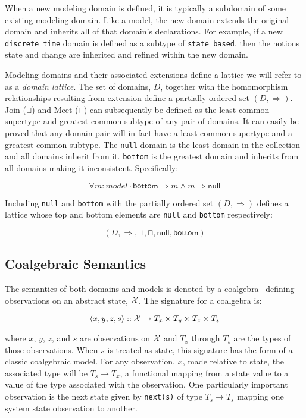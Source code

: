 \documentclass[12pt]{article}
\begin{document}
When a new modeling domain is defined, it is typically a subdomain of some existing
modeling domain.  Like a model, the new domain extends the original domain and inherits
all of that domain's declarations.  For example, if a new \lstinline!discrete_time! domain
is defined as a subtype of \lstinline!state_based!, then the notions state and change are
inherited and refined within the new domain.

Modeling domains and their associated extensions define a lattice we will refer to as a
\emph{domain lattice}.  The set of domains, $D$, together with the homomorphism
relationships resulting from extension define a partially ordered set $(D,\Rightarrow)$.
Join ($\sqcup$) and Meet ($\sqcap$) can subsequently be defined as the least common
supertype and greatest common subtype of any pair of domains.  It can easily be proved
that any domain pair will in fact have a least common supertype and a greatest common
subtype.  The \lstinline!null! domain is the least domain in the collection and all
domains inherit from it.  \lstinline!bottom! is the greatest domain and inherits from all
domains making it inconsistent.  Specifically:

\[\forall m:model \cdot \mathsf{bottom} \Rightarrow m \wedge m \Rightarrow \mathsf{null}\]

\noindent
Including \lstinline!null! and \lstinline!bottom! with the partially ordered set
$(D,\Rightarrow)$ defines a lattice whose top and bottom elements are \lstinline!null! and
\lstinline!bottom! respectively:

\[(D,\Rightarrow,\sqcup,\sqcap,\mathsf{null},\mathsf{bottom})\]

\subsection{Coalgebraic Semantics}

The semantics of both domains and models is denoted by a
coalgebra~\cite{Jacobs:97:A-Tutorial-on-C} defining observations on an abstract state,
$\mathcal X$.  The signature for a coalgebra is:

\[\langle x,y,z,s \rangle::\mathcal X \rightarrow
T_x\times T_y\times T_z\times T_s\]

\noindent where $x$, $y$, $z$, and $s$ are observations on $\mathcal X$ and $T_x$ through
$T_s$ are the types of those observations.  When $s$ is treated as state, this signature
has the form of a classic coalgebraic model.  For any observation, $x$, made relative to
state, the associated type will be $T_s\rightarrow T_x$, a functional mapping from a state
value to a value of the type associated with the observation.  One particularly important
observation is the next state given by \lstinline!next(s)! of type $T_s\rightarrow T_s$
mapping one system state observation to another.
\end{document}
